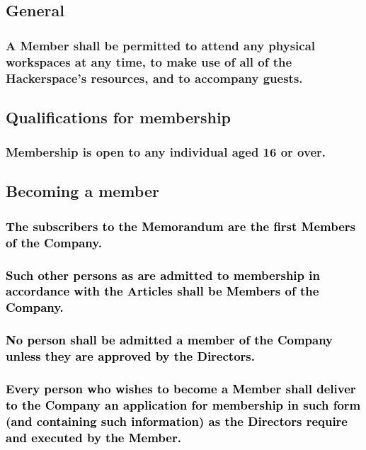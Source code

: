\documentclass[12pt]{article}
\def\fakecolour{black}
\begin{document}
\subsection{General}
\subsubsection[Members' access to resources]{A Member shall be permitted to attend any physical workspaces at any time, to make use of all of the Hackerspace's resources, and to accompany guests.}

\subsection{Qualifications for membership}
\subsubsection{Membership is open to any individual aged 16 or over.}

\subsection{Becoming a member}
\subsubsection[First Members of the Company]{\textcolor{\fakecolour}{The subscribers to the Memorandum are the first Members of the Company.}}
\subsubsection[Members are admitted in accordance with Articles]{\textcolor{\fakecolour}{Such other persons as are admitted to membership in accordance with the Articles shall be Members of the Company.}}
\subsubsection[Potential Members must be approved by Directors]{\textcolor{\fakecolour}{No person shall be admitted a member of the Company unless they are approved by the Directors.}}
\subsubsection[Potential Members must apply for membership]{\textcolor{\fakecolour}{Every person who wishes to become a Member shall deliver to the Company an application for membership in such form (and containing such information) as the Directors require and executed by the Member.}} %
\end{document}
